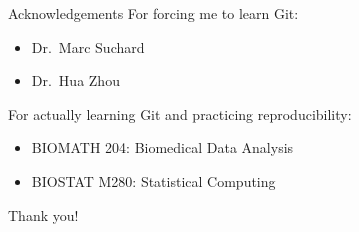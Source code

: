 \documentclass{beamer}
\begin{document}


%
%
%
%

\begin{frame}{Acknowledgements}
  For forcing me to learn Git:
  \begin{itemize}
    \item Dr.\ Marc Suchard
    \item Dr.\ Hua Zhou
  \end{itemize}

  For actually learning Git and practicing reproducibility:
  \begin{itemize}
    \item BIOMATH 204: Biomedical Data Analysis
    \item BIOSTAT M280: Statistical Computing
  \end{itemize}

  \center Thank you!
\end{frame}
\end{document}
